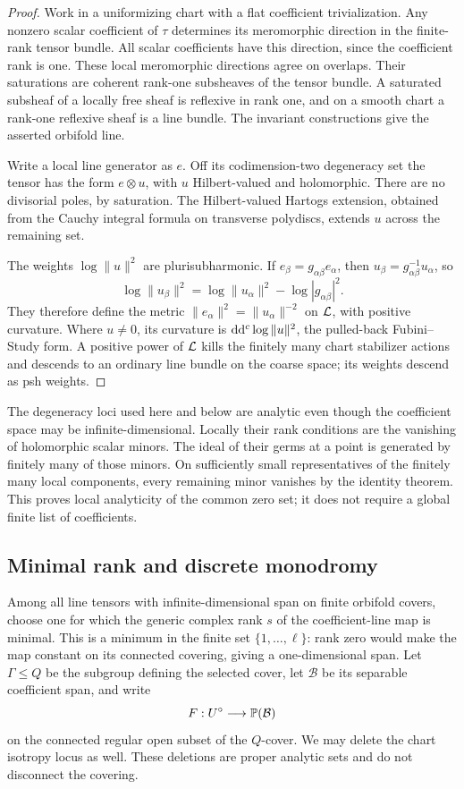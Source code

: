\begin{proof}
Work in a uniformizing chart with a flat coefficient trivialization.
Any nonzero scalar coefficient of \(\tau\) determines its
meromorphic direction in the finite-rank tensor bundle. All scalar
coefficients have this direction, since the coefficient rank is one.
These local meromorphic directions agree on overlaps. Their
saturations are coherent rank-one subsheaves of the tensor bundle.
A saturated subsheaf of a locally free sheaf is reflexive in rank
one, and on a smooth chart a rank-one reflexive sheaf is a line
bundle. The invariant constructions give the asserted orbifold line.

Write a local line generator as \(e\). Off its codimension-two
degeneracy set the tensor has the form \(e\otimes u\), with \(u\)
Hilbert-valued and holomorphic. There are no divisorial poles, by
saturation. The Hilbert-valued Hartogs extension, obtained from the
Cauchy integral formula on transverse polydiscs, extends \(u\)
across the remaining set.

The weights \(\log\|u\|^2\) are plurisubharmonic. If
\(e_\beta=g_{\alpha\beta}e_\alpha\), then
\(u_\beta=g_{\alpha\beta}^{-1}u_\alpha\), so
\[
 \log\|u_\beta\|^2
 =\log\|u_\alpha\|^2-\log|g_{\alpha\beta}|^2.
\]
They therefore define the metric
\(\|e_\alpha\|^2=\|u_\alpha\|^{-2}\) on \(\mathcal L\), with positive
curvature. Where \(u\ne0\), its curvature is
\(\mathrm d\mathrm d^c\log\|u\|^2\), the pulled-back Fubini--Study form.
A positive power of \(\mathcal L\) kills the finitely many chart
stabilizer actions and descends to an ordinary line bundle on the
coarse space; its weights descend as psh weights.
\end{proof}

The degeneracy loci used here and below are analytic even though the
coefficient space may be infinite-dimensional. Locally their rank
conditions are the vanishing of holomorphic scalar minors.
The ideal of their germs at a point is generated by finitely many
of those minors. On sufficiently small representatives of the
finitely many local components, every remaining minor vanishes by
the identity theorem. This proves local analyticity of the common
zero set; it does not require a global finite list of coefficients.

\subsection{Minimal rank and discrete monodromy}

Among all line tensors with infinite-dimensional span on finite
orbifold covers, choose one for which the generic complex rank \(s\)
of the coefficient-line map is minimal. This is a minimum in the
finite set \(\{1,\ldots,\ell\}\): rank zero would make the map
constant on its connected covering, giving a one-dimensional span.
Let \(\Gamma\le Q\) be the subgroup defining the selected cover,
let \(\mathcal B\) be its separable coefficient span, and write
\[
 F:U^\circ\longrightarrow\mathbb P(\mathcal B)
\]
on the connected regular open subset of the \(Q\)-cover. We may
delete the chart isotropy locus as well. These deletions are proper
analytic sets and do not disconnect the covering.

